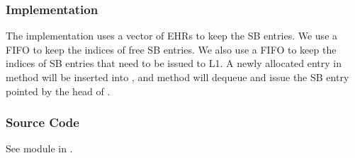 \subsubsection{Implementation}
The implementation uses a vector of EHRs to keep the SB entries.
We use a FIFO  to keep the indices of free SB entries.
We also use a FIFO  to keep the indices of SB entries that need to be issued to L1.
A newly allocated entry in method  will be inserted into , and method  will dequeue  and issue the SB entry pointed by the head of .

\subsubsection{Source Code}
See module  in .

